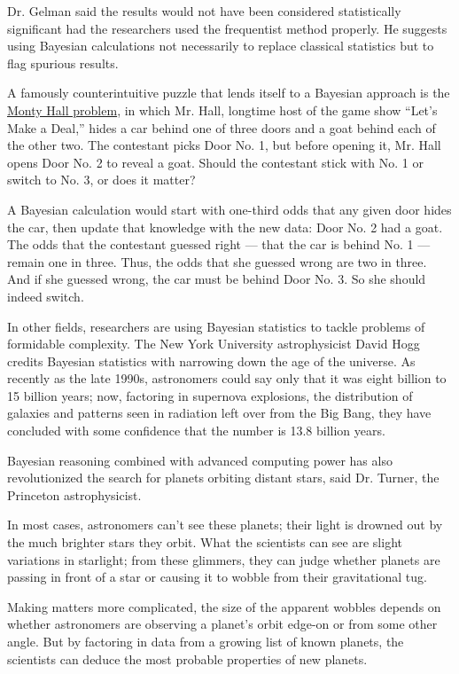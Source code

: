 Dr. Gelman said the results would not have been considered statistically
significant had the researchers used the frequentist method properly. He
suggests using Bayesian calculations not necessarily to replace
classical statistics but to flag spurious results.

A famously counterintuitive puzzle that lends itself to a Bayesian
approach is the
\href{http://www.nytimes.com/2008/04/08/science/08tier.html}{Monty Hall
problem}, in which Mr. Hall, longtime host of the game show ``Let's Make
a Deal,'' hides a car behind one of three doors and a goat behind each
of the other two. The contestant picks Door No. 1, but before opening
it, Mr. Hall opens Door No. 2 to reveal a goat. Should the contestant
stick with No. 1 or switch to No. 3, or does it matter?

A Bayesian calculation would start with one-third odds that any given
door hides the car, then update that knowledge with the new data: Door
No. 2 had a goat. The odds that the contestant guessed right --- that
the car is behind No. 1 --- remain one in three. Thus, the odds that she
guessed wrong are two in three. And if she guessed wrong, the car must
be behind Door No. 3. So she should indeed switch.

In other fields, researchers are using Bayesian statistics to tackle
problems of formidable complexity. The New York University
astrophysicist David Hogg credits Bayesian statistics with narrowing
down the age of the universe. As recently as the late 1990s, astronomers
could say only that it was eight billion to 15 billion years; now,
factoring in supernova explosions, the distribution of galaxies and
patterns seen in radiation left over from the Big Bang, they have
concluded with some confidence that the number is 13.8 billion years.

Bayesian reasoning combined with advanced computing power has also
revolutionized the search for planets orbiting distant stars, said Dr.
Turner, the Princeton astrophysicist.

In most cases, astronomers can't see these planets; their light is
drowned out by the much brighter stars they orbit. What the scientists
can see are slight variations in starlight; from these glimmers, they
can judge whether planets are passing in front of a star or causing it
to wobble from their gravitational tug.

Making matters more complicated, the size of the apparent wobbles
depends on whether astronomers are observing a planet's orbit edge-on or
from some other angle. But by factoring in data from a growing list of
known planets, the scientists can deduce the most probable properties of
new planets.

